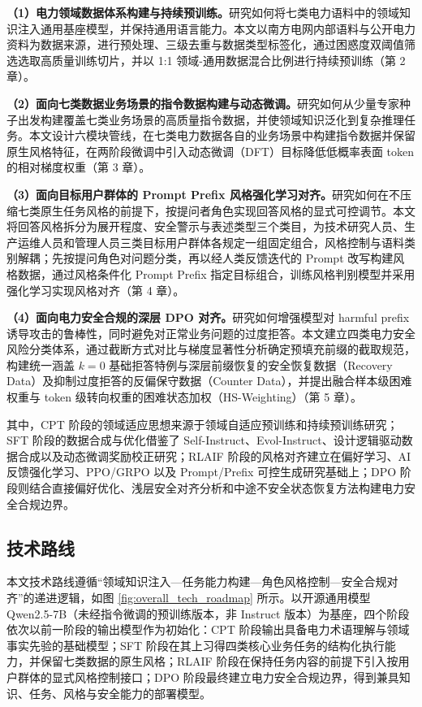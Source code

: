 \documentclass[fontset=fandol,type=master,campus=shenzhen,etitleauto=true]{hithesisbook}
\begin{document}
\textbf{（1）电力领域数据体系构建与持续预训练。}研究如何将七类电力语料中的领域知识注入通用基座模型，并保持通用语言能力。本文以南方电网内部语料与公开电力资料为数据来源，进行预处理、三级去重与数据类型标签化，通过困惑度双阈值筛选选取高质量训练切片，并以 1:1 领域-通用数据混合比例进行持续预训练（第 2 章）。

\textbf{（2）面向七类数据业务场景的指令数据构建与动态微调。}研究如何从少量专家种子出发构建覆盖七类业务场景的高质量指令数据，并使领域知识泛化到复杂推理任务。本文设计六模块管线，在七类电力数据各自的业务场景中构建指令数据并保留原生风格特征，在两阶段微调中引入动态微调（DFT）目标降低低概率表面 token 的相对梯度权重（第 3 章）。

\textbf{（3）面向目标用户群体的 Prompt Prefix 风格强化学习对齐。}研究如何在不压缩七类原生任务风格的前提下，按提问者角色实现回答风格的显式可控调节。本文将回答风格拆分为展开程度、安全警示与表述类型三个类目，为技术研究人员、生产运维人员和管理人员三类目标用户群体各规定一组固定组合，风格控制与语料类别解耦；先按提问角色对问题分类，再以经人类反馈迭代的 Prompt 改写构建风格数据，通过风格条件化 Prompt Prefix 指定目标组合，训练风格判别模型并采用强化学习实现风格对齐（第 4 章）。

\textbf{（4）面向电力安全合规的深层 DPO 对齐。}研究如何增强模型对 harmful prefix 诱导攻击的鲁棒性，同时避免对正常业务问题的过度拒答。本文建立四类电力安全风险分类体系，通过截断方式对比与梯度显著性分析确定预填充前缀的截取规范，构建统一涵盖 $k=0$ 基础拒答特例与深层前缀恢复的安全恢复数据（Recovery Data）及抑制过度拒答的反偏保守数据（Counter Data），并提出融合样本级困难权重与 token 级转向权重的困难状态加权（HS-Weighting）（第 5 章）。

其中，CPT 阶段的领域适应思想来源于领域自适应预训练和持续预训练研究\cite{ref6,ref52}；SFT 阶段的数据合成与优化借鉴了 Self-Instruct、Evol-Instruct、设计逻辑驱动数据合成以及动态微调奖励校正研究\cite{ref24,ref25,ref53,ref54,ref82}；RLAIF 阶段的风格对齐建立在偏好学习、AI 反馈强化学习、PPO/GRPO 以及 Prompt/Prefix 可控生成研究基础上\cite{ref30,ref31,ref32,ref44,ref90,ref33,ref34,ref35,ref36,ref37,ref38,ref39}；DPO 阶段则结合直接偏好优化、浅层安全对齐分析和中途不安全状态恢复方法构建电力安全合规边界\cite{ref40,ref44,ref45,ref46,ref47,ref48,ref83,ref84}。

\subsection{技术路线}

本文技术路线遵循“领域知识注入—任务能力构建—角色风格控制—安全合规对齐”的递进逻辑，如图 \ref{fig:overall_tech_roadmap} 所示。以开源通用模型 Qwen2.5-7B\cite{ref55}（未经指令微调的预训练版本，非 Instruct 版本）为基座，四个阶段依次以前一阶段的输出模型作为初始化：CPT 阶段输出具备电力术语理解与领域事实先验的基础模型；SFT 阶段在其上习得四类核心业务任务的结构化执行能力，并保留七类数据的原生风格；RLAIF 阶段在保持任务内容的前提下引入按用户群体的显式风格控制接口；DPO 阶段最终建立电力安全合规边界，得到兼具知识、任务、风格与安全能力的部署模型。
\end{document}
